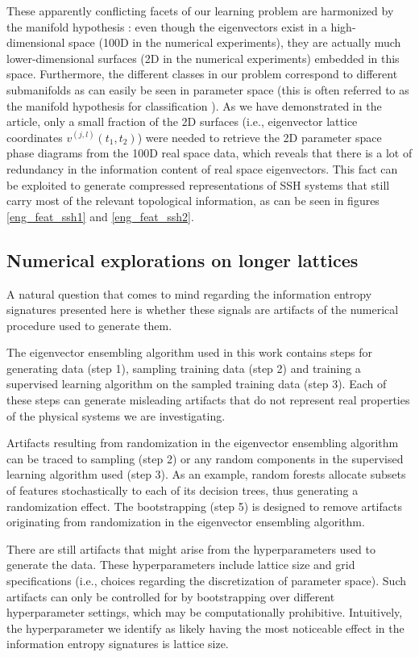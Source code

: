 \documentclass[10pt]{revtex4-1}
\begin{document}
These apparently conflicting facets of our learning problem are harmonized by the manifold hypothesis \cite{cayton2005algorithms,narayanan2010sample}: even though the eigenvectors exist in a high-dimensional space (100D in the numerical experiments), they are actually much lower-dimensional surfaces (2D in the numerical experiments) embedded in this space. Furthermore, the different classes in our problem correspond to different submanifolds as can easily be seen in parameter space (this is often referred to as the manifold hypothesis for classification \cite{rifai2011manifold}). As we have demonstrated in the article, only a small fraction of the 2D surfaces (i.e., eigenvector lattice coordinates $v^{(j,l)}(t_1,t_2)$) were needed to retrieve the 2D parameter space phase diagrams from the 100D real space data, which reveals that there is a lot of redundancy in the information content of real space eigenvectors. This fact can be exploited to generate compressed representations of SSH systems that still carry most of the relevant topological information, as can be seen in figures \ref{eng_feat_ssh1} and \ref{eng_feat_ssh2}.  

\subsection*{Numerical explorations on longer lattices}

A natural question that comes to mind regarding the information entropy signatures presented here is whether these signals are artifacts of the numerical procedure used to generate them.

The eigenvector ensembling algorithm used in this work contains steps for generating data (step 1), sampling training data (step 2) and training a supervised learning algorithm on the sampled training data (step 3). Each of these steps can generate misleading artifacts that do not represent real properties of the physical systems we are investigating.

Artifacts resulting from randomization in the eigenvector ensembling algorithm can be traced to sampling (step 2) or any random components in the supervised learning algorithm used (step 3). As an example, random forests allocate subsets of features stochastically to each of its decision trees, thus generating a randomization effect. The bootstrapping (step 5) is designed to remove artifacts originating from randomization in the eigenvector ensembling algorithm.

There are still artifacts that might arise from the hyperparameters used to generate the data. These hyperparameters include lattice size and grid specifications (i.e., choices regarding the discretization of parameter space). Such artifacts can only be controlled for by bootstrapping over different hyperparameter settings, which may be computationally prohibitive. Intuitively, the hyperparameter we identify as likely having the most noticeable effect in the information entropy signatures is lattice size.
\end{document}
